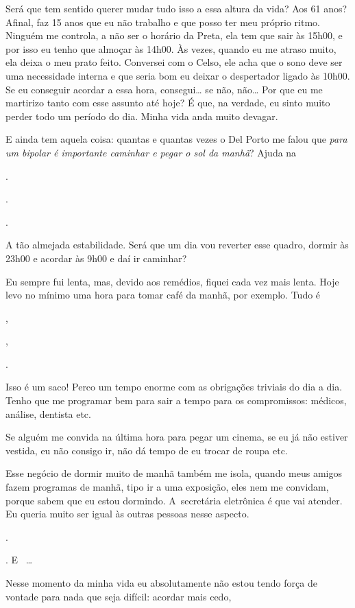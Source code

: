 Será que tem sentido querer mudar tudo isso a essa altura da vida? Aos
61 anos? Afinal, faz 15 anos que eu não trabalho e que posso ter meu
próprio ritmo. Ninguém me controla, a não ser o horário da Preta, ela
tem que sair às 15h00, e por isso eu tenho que almoçar às 14h00. Às
vezes, quando eu me atraso muito, ela deixa o meu prato feito. Conversei
com o Celso, ele acha que o sono deve ser uma necessidade interna e que
seria bom eu deixar o despertador ligado às 10h00. Se eu conseguir
acordar a essa hora, consegui… se não, não… Por que eu me
martirizo tanto com esse assunto até hoje? É que, na verdade, eu sinto
muito perder todo um período do dia. Minha vida anda muito devagar.

E ainda tem aquela coisa: quantas e quantas vezes o Del Porto me falou
que \emph{para um bipolar é importante caminhar e pegar o sol da manhã}?
Ajuda na

.

.

.

A tão almejada estabilidade. Será que um dia vou reverter esse quadro,
dormir às 23h00 e acordar às 9h00 e daí ir caminhar?

Eu sempre fui lenta, mas, devido aos remédios, fiquei cada vez mais
lenta. Hoje levo no mínimo uma hora para tomar café da manhã, por
exemplo. Tudo é

,

,

.

Isso é um saco! Perco um tempo enorme com as obrigações triviais do
dia a dia. Tenho que me programar bem para sair a tempo para os
compromissos: médicos, análise, dentista etc.

Se alguém me convida na última hora para pegar um cinema, se eu já não
estiver vestida, eu não consigo ir, não dá tempo de eu trocar de roupa
etc.

Esse negócio de dormir muito de manhã também me isola, quando meus
amigos fazem programas de manhã, tipo ir a uma exposição, eles nem me
convidam, porque sabem que eu estou dormindo. A~secretária eletrônica é
que vai atender. Eu queria muito ser igual às outras pessoas nesse
aspecto.

.

. E~   …

Nesse momento da minha vida eu absolutamente não estou tendo força de
vontade para nada que seja difícil: acordar mais cedo,

